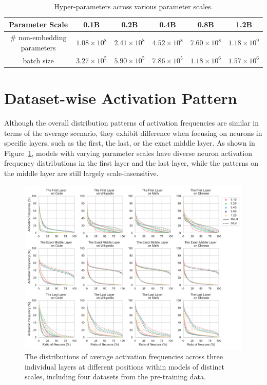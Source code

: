 \documentclass{article} %
\begin{document}
\begin{table}[ht]
\caption{Hyper-parameters across various parameter scales.}
\footnotesize
\label{table:hyper-parameters}
\begin{center}
\begin{tabular}{c|ccccc}
\toprule
Parameter Scale & 0.1B & 0.2B & 0.4B & 0.8B & 1.2B \\
\midrule
$\#$ non-embedding parameters & $1.08\times 10^8$ & $2.41\times 10^8$ & $4.52\times 10^8$ & $7.60\times 10^8$ & $1.18\times 10^9$ \\
batch size & $3.27\times 10^5$ & $5.90\times 10^5$ & $7.86\times 10^5$ & $1.18\times 10^6$ & $1.57\times 10^6$ \\
\bottomrule
\end{tabular}
\end{center}
\end{table}


\section{Dataset-wise Activation Pattern} \label{sec:dataset-wise-exp}

Although the overall distribution patterns of activation frequencies are similar in terms of the average scenario, they exhibit difference when focusing on neurons in specific layers, such as the first, the last, or the exact middle layer. 
As shown in Figure~\ref{fig:task-dist-single-layer}, models with varying parameter scales have diverse neuron activation frequency distributions in the first layer and the last layer, while the patterns on the middle layer are still largely scale-insensitive.


\begin{figure}[ht]
    \centering
    \includegraphics[width=\linewidth]{figures/task-dist-single-layer.pdf}
    \caption{The distributions of average activation frequencies across three individual layers at different positions within models of distinct scales, including four datasets from the pre-training data.}
    \label{fig:task-dist-single-layer}
\end{figure}
\end{document}
